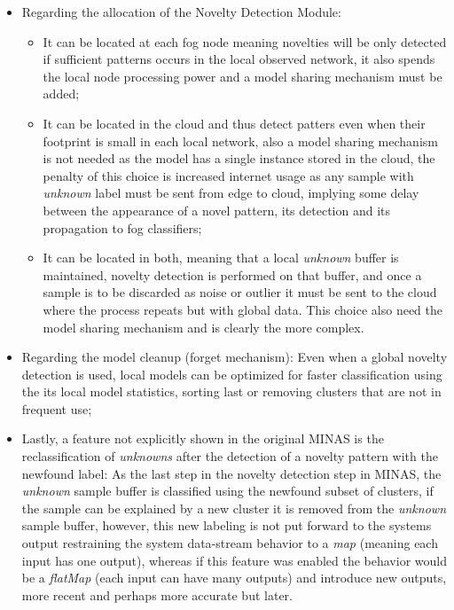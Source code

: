\begin{itemize}
    \item Regarding the allocation of the Novelty Detection Module:
    \begin{itemize}
        \item 
        It can be located at each fog node meaning novelties will be only
        detected if sufficient patterns occurs in the local observed network,
        it also spends the local node processing power and a model sharing mechanism 
        must be added;
        \item It can be located in the cloud and thus detect patters even when
        their footprint is small in each local network, also a model sharing mechanism
        is not needed as the model has a single instance stored in the cloud,
        the penalty of this choice is increased internet usage as any sample with
        \emph{unknown} label must be sent from edge to cloud, implying some delay
        between the appearance of a novel pattern, its detection and its propagation
        to fog classifiers;
        \item It can be located in both, meaning that a local \emph{unknown} buffer
        is maintained, novelty detection is performed on that buffer, and once
        a sample is to be discarded as noise or outlier it must be sent to the cloud
        where the process repeats but with global data. This choice also need the model
        sharing mechanism and is clearly the more complex.
    \end{itemize}
    \item Regarding the model cleanup (forget mechanism):
    Even when a global novelty detection is used, local models can be optimized for faster
    classification using the its local model statistics, sorting last or removing clusters that
    are not in frequent use;
    \item Lastly, a feature not explicitly shown in the original MINAS is the reclassification
    of \emph{unknowns} after the detection of a novelty pattern with the newfound label:
    As the last step in the novelty detection step in MINAS, the \emph{unknown} sample buffer is
    classified using the newfound subset of clusters, if the sample can be explained by a new cluster
    it is removed from the \emph{unknown} sample buffer, however, this new labeling is not put forward
    to the systems output restraining the system data-stream behavior to a \emph{map} (meaning each input
    has one output), whereas if this feature was enabled the behavior would be a \emph{flatMap} (each input
    can have many outputs) and introduce new outputs, more recent and perhaps more accurate but later.
\end{itemize}

